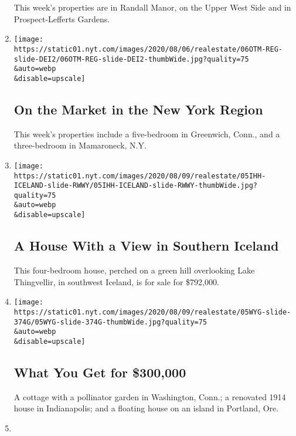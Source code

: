 \begin{enumerate}
  This week's properties are in Randall Manor, on the Upper West Side
  and in Prospect-Lefferts Gardens.
\item
  \href{/slideshow/2020/08/06/realestate/on-the-market-in-the-new-york-region.html}{}

  \texttt{[image: https://static01.nyt.com/images/2020/08/06/realestate/06OTM-REG-slide-DEI2/06OTM-REG-slide-DEI2-thumbWide.jpg?quality=75\\\&auto=webp\\\&disable=upscale]}

  \hypertarget{on-the-market-in-the-new-york-region}{%
  \subsection{On the Market in the New York
  Region}\label{on-the-market-in-the-new-york-region}}

  This week's properties include a five-bedroom in Greenwich, Conn., and
  a three-bedroom in Mamaroneck, N.Y.
\item
  \href{/slideshow/2020/08/05/realestate/a-house-with-a-view-in-southern-iceland.html}{}

  \texttt{[image: https://static01.nyt.com/images/2020/08/09/realestate/05IHH-ICELAND-slide-RWWY/05IHH-ICELAND-slide-RWWY-thumbWide.jpg?quality=75\\\&auto=webp\\\&disable=upscale]}

  \hypertarget{a-house-with-a-view-in-southern-iceland}{%
  \subsection{A House With a View in Southern
  Iceland}\label{a-house-with-a-view-in-southern-iceland}}

  This four-bedroom house, perched on a green hill overlooking Lake
  Thingvellir, in southwest Iceland, is for sale for \$792,000.
\item
  \href{/slideshow/2020/08/05/realestate/what-you-get-for-300000.html}{}

  \texttt{[image: https://static01.nyt.com/images/2020/08/09/realestate/05WYG-slide-374G/05WYG-slide-374G-thumbWide.jpg?quality=75\\\&auto=webp\\\&disable=upscale]}

  \hypertarget{what-you-get-for-300000}{%
  \subsection{What You Get for
  \$300,000}\label{what-you-get-for-300000}}

  A cottage with a pollinator garden in Washington, Conn.; a renovated
  1914 house in Indianapolis; and a floating house on an island in
  Portland, Ore.
\item
  \href{/slideshow/2020/08/05/realestate/living-in-greenwood-heights-brooklyn.html}{}


\end{enumerate}
